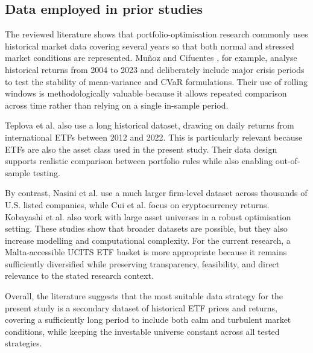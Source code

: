 \subsection{Data employed in prior studies}
\label{subsec:lit-data}
\par The reviewed literature shows that portfolio-optimisation research commonly uses historical market data covering several years so that both normal and stressed market conditions are represented. Muñoz and Cifuentes \cite{munoz2026riskmetrics}, for example, analyse historical returns from 2004 to 2023 and deliberately include major crisis periods to test the stability of mean-variance and CVaR formulations. Their use of rolling windows is methodologically valuable because it allows repeated comparison across time rather than relying on a single in-sample period.
\par Teplova et al. \cite{teplova2023blcopula} also use a long historical dataset, drawing on daily returns from international ETFs between 2012 and 2022. This is particularly relevant because ETFs are also the asset class used in the present study. Their data design supports realistic comparison between portfolio rules while also enabling out-of-sample testing.
\par By contrast, Nasini et al. \cite{nasini2022multimarket} use a much larger firm-level dataset across thousands of U.S. listed companies, while Cui et al. \cite{cui2023cvarrlcrypto} focus on cryptocurrency returns. Kobayashi et al. \cite{kobayashi2023cardinalitydro} also work with large asset universes in a robust optimisation setting. These studies show that broader datasets are possible, but they also increase modelling and computational complexity. For the current research, a Malta-accessible UCITS ETF basket is more appropriate because it remains sufficiently diversified while preserving transparency, feasibility, and direct relevance to the stated research context.
\par Overall, the literature suggests that the most suitable data strategy for the present study is a secondary dataset of historical ETF prices and returns, covering a sufficiently long period to include both calm and turbulent market conditions, while keeping the investable universe constant across all tested strategies.

